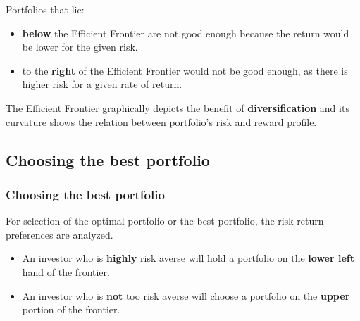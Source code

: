 \documentclass{beamer}
\begin{document}
\begin{frame}

\justifying
Portfolios that lie:
\begin{itemize}
	\justifying
	\item  \textbf{below} the Efficient Frontier are not good enough because the return would be lower for the given risk.
	\item to the \textbf{right} of the Efficient Frontier would not be good enough, as there is higher risk for a given rate of return.
\end{itemize}

\vspace{0.8cm}
\justifying
The Efficient Frontier graphically depicts the benefit of \textbf{diversification} and its curvature shows the relation between portfolio's risk and reward profile.

\end{frame}




\subsection{Choosing the best portfolio}

\begin{frame}
\frametitle{\textbf{Choosing the best portfolio}}

\justifying
For selection of the optimal portfolio or the best portfolio, the risk-return preferences are analyzed.
\vspace{0.4cm}
\begin{itemize}
	\justifying
	\item An investor who is \textbf{highly} risk averse will hold a portfolio on the \textbf{lower left} hand of the frontier.
	\item An investor who is \textbf{not} too risk averse will choose a portfolio on the \textbf{upper} portion of the frontier.
\end{itemize}

\end{frame}

\end{document}
